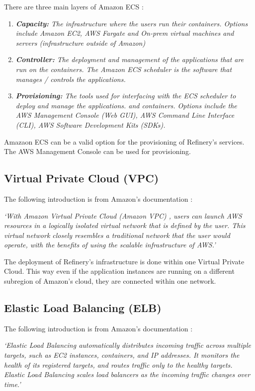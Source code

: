 		There are three main layers of Amazon ECS \cite{ecs}:
		\begin{enumerate}
			\item \textit{\textbf{Capacity:} The infrastructure where the users run their containers. Options include Amazon EC2, 
			AWS Fargate and On-prem virtual machines and servers (infrastructure outside of Amazon) }
			\item \textit{\textbf{Controller:} The deployment and management of the applications that are run on the containers. The Amazon
			ECS scheduler is the software that manages / controls the applications.}
			\item \textit{\textbf{Provisioning:} The tools used for interfacing with the ECS scheduler to deploy and manage the applications.
			and containers. Options include the AWS Management Console (Web GUI), AWS Command Line Interface (CLI), 
			AWS Software Development Kits (SDKs).}
		\end{enumerate}

		Amazaon ECS can be a valid option for the provisioning of Refinery's services. The AWS Management Console 
		can be used for provisioning.

	\subsection{Virtual Private Cloud (VPC)} \label{backgvpc}
		The following introduction is from Amazon's documentation \cite{vpc}:

		\textit{`With Amazon Virtual Private Cloud (Amazon VPC) \cite{vpc}, users can launch AWS resources in a logically 
		isolated virtual network that is defined by the user. This virtual network closely resembles a traditional network 
		that the user would operate, with the benefits of using the scalable infrastructure of AWS.'}

		The deployment of Refinery's infrastructure is done within one Virtual Private Cloud. This way even if 
		the application instances are running on a different subregion of Amazon's cloud, they are connected within one network.

	\subsection{Elastic Load Balancing (ELB)} \label{backgelb}
		The following introduction is from Amazon's documentation \cite{elb}:

		\textit{`Elastic Load Balancing \cite{elb} automatically distributes incoming traffic across multiple targets, 
		such as EC2 instances, containers, and IP addresses. 
		It monitors the health of its registered targets, and routes traffic only to the healthy targets. 
		Elastic Load Balancing scales load balancers as the incoming traffic changes over time.'}

